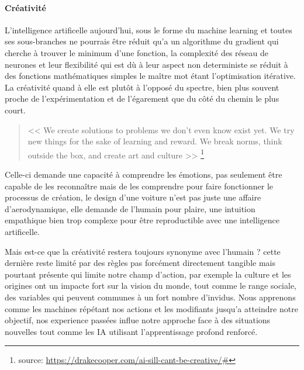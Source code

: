         \paragraph{Créativité} 
        L'intelligence artificelle aujourd'hui, sous le forme du machine learning et toutes ses
        sous-branches ne pourrais être réduit qu'a un algorithme du gradient qui cherche à trouver 
        le minimum d'une fonction, la complexité des réseau de neurones et leur flexibilité qui 
        est dù à leur aspect non deterministe se réduit à des fonctions mathématiques simples 
        le maître mot étant l'optimisation itérative. 
        La créativité quand à elle est plutôt à l'opposé du spectre, bien plus souvent proche de 
        l'expérimentation et de l'égarement que du côté du chemin le plus court. \newline

        \begin{quote}
            << We create solutions to problems we don’t even know exist yet. 
            We try new things for the sake of learning and reward. 
            We break norms, think outside the box, and create art and culture >>
            \footnote{source: \url{https://drakecooper.com/ai-sill-cant-be-creative/\#}}
            \newline
        \end{quote}

        Celle-ci demande une capacité à comprendre les émotions, pas seulement être capable de 
        les reconnaître mais de les comprendre pour faire fonctionner le processus de création,
        le design d'une voiture n'est pas juste une affaire d'aerodynamique, elle demande 
        de l'humain pour plaire, une intuition empathique bien trop complexe pour être reproductible 
        avec une intelligence artificelle. \newline 

        Mais est-ce que la créativité restera toujours synonyme avec l'humain ? 
        cette dernière reste limité par des règles pas forcément directement tangible mais pourtant 
        présente qui limite notre champ d'action, 
        par exemple la culture et les origines ont un impacte fort sur la vision du monde, 
        tout comme le range sociale, des variables qui peuvent communes à un fort nombre d'invidus.
        Nous apprenons comme les machines répétant nos actions et les modifiants jusqu'a 
        atteindre notre objectif, nos experience passées influe notre approche face à des 
        situations nouvelles tout comme les IA utilisant l'apprentissage profond renforcé.
        \newline
        
